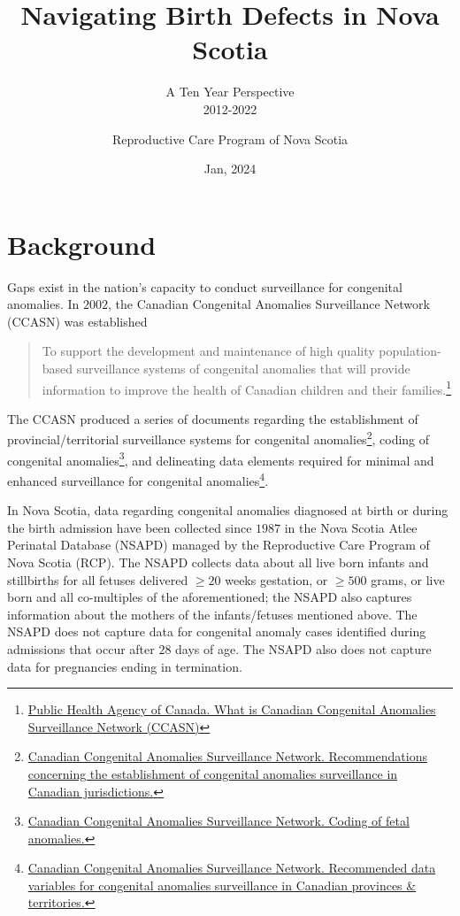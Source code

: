 \documentclass[
]{krantz}
\title{Navigating Birth Defects in Nova Scotia}
\subtitle{A Ten Year Perspective\\
2012-2022}
\author{Reproductive Care Program of Nova Scotia}
\date{Jan, 2024}
\begin{document}
\pagestyle{empty}

\setcounter{page}{1}
\maketitle
\thispagestyle{empty}
\newpage


{
\hypersetup{linkcolor=}
\setcounter{tocdepth}{3}
\tableofcontents
\newpage
}


\hypertarget{background}{%
\chapter*{Background}\label{background}}


Gaps exist in the nation's capacity to conduct surveillance for congenital anomalies. In \(2002\), the Canadian Congenital Anomalies Surveillance Network (CCASN) was established

\begin{quote}
To support the development and maintenance of high quality population-based surveillance systems of congenital anomalies that will provide information to improve the health of Canadian children and their families.\footnote{\href{http://www.phac-aspc.gc.ca/ccasn-rcsac/index-eng.php}{Public Health Agency of Canada. What is Canadian Congenital Anomalies Surveillance Network (CCASN)}}
\end{quote}

The CCASN produced a series of documents regarding the establishment of provincial/territorial surveillance systems for congenital anomalies\footnote{\href{https://www.canada.ca/en/public-health/services/health-promotion/what-is-ccasn/guidelines.html}{Canadian Congenital Anomalies Surveillance Network. Recommendations concerning the establishment of congenital anomalies surveillance in Canadian jurisdictions.}}, coding of congenital anomalies\footnote{\href{https://health-infobase.canada.ca/congenital-anomalies/}{Canadian Congenital Anomalies Surveillance Network. Coding of fetal anomalies.}}, and delineating data elements required for minimal and enhanced surveillance for congenital anomalies\footnote{\href{https://www.phac-aspc.gc.ca/ccasn-rcsac/sac-cas/pdf/cas-eng.pdf}{Canadian Congenital Anomalies Surveillance Network. Recommended data variables for congenital anomalies surveillance in Canadian provinces \& territories.}}.

In Nova Scotia, data regarding congenital anomalies diagnosed at birth or during the birth admission have been collected since \(1987\) in the Nova Scotia Atlee Perinatal Database (NSAPD) managed by the Reproductive Care Program of Nova Scotia (RCP). The NSAPD collects data about all live born infants and stillbirths for all fetuses delivered \(\ge 20\) weeks gestation, or \(\ge 500\) grams, or live born and all co-multiples of the aforementioned; the NSAPD also captures information about the mothers of the infants/fetuses mentioned above. The NSAPD does not capture data for congenital anomaly cases identified during admissions that occur after \(28\) days of age. The NSAPD also does not capture data for pregnancies ending in termination.
\end{document}
